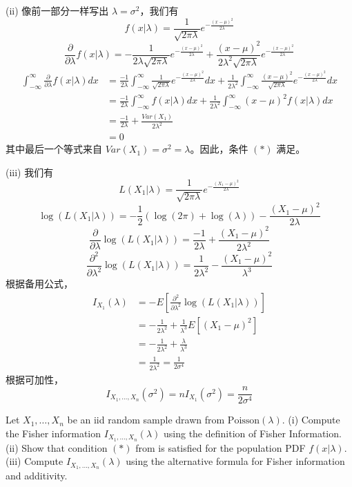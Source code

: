 \begin{questions}
\begin{solution}
(ii) 像前一部分一样写出 $\lambda = \sigma^2$，我们有
\[
f(x|\lambda) = \frac{1}{\sqrt{2\pi\lambda}} e^{-\frac{(x-\mu)^2}{2\lambda}}
\]
\[
\frac{\partial}{\partial \lambda} f(x|\lambda) = -\frac{1}{2\lambda\sqrt{2\pi\lambda}} e^{-\frac{(x-\mu)^2}{2\lambda}} + \frac{(x-\mu)^2}{2\lambda^2\sqrt{2\pi\lambda}} e^{-\frac{(x-\mu)^2}{2\lambda}}
\]
\begin{align*}
\int_{-\infty}^{\infty} \frac{\partial}{\partial \lambda} f(x|\lambda) dx &= \frac{-1}{2\lambda} \int_{-\infty}^{\infty} \frac{1}{\sqrt{2\pi\lambda}} e^{-\frac{(x-\mu)^2}{2\lambda}} dx + \frac{1}{2\lambda^2} \int_{-\infty}^{\infty} \frac{(x-\mu)^2}{\sqrt{2\pi\lambda}} e^{-\frac{(x-\mu)^2}{2\lambda}} dx \\
&= \frac{-1}{2\lambda} \int_{-\infty}^{\infty} f(x|\lambda) dx + \frac{1}{2\lambda^2} \int_{-\infty}^{\infty} (x-\mu)^2 f(x|\lambda) dx \\
&= \frac{-1}{2\lambda} + \frac{Var(X_1)}{2\lambda^2} \\
&= 0
\end{align*}
其中最后一个等式来自 $Var(X_1) = \sigma^2 = \lambda$。因此，条件 $(*)$ 满足。

(iii) 我们有
\[
L(X_1|\lambda) = \frac{1}{\sqrt{2\pi\lambda}} e^{-\frac{(X_1-\mu)^2}{2\lambda}}
\]
\[
\log(L(X_1|\lambda)) = -\frac{1}{2} (\log(2\pi) + \log(\lambda)) - \frac{(X_1-\mu)^2}{2\lambda}
\]
\[
\frac{\partial}{\partial \lambda} \log(L(X_1|\lambda)) = \frac{-1}{2\lambda} + \frac{(X_1-\mu)^2}{2\lambda^2}
\]
\[
\frac{\partial^2}{\partial \lambda^2} \log(L(X_1|\lambda)) = \frac{1}{2\lambda^2} - \frac{(X_1-\mu)^2}{\lambda^3}
\]
根据备用公式，
\begin{align*}
I_{X_1}(\lambda) &= -E\left[\frac{\partial^2}{\partial \lambda^2} \log(L(X_1|\lambda))\right] \\
&= -\frac{1}{2\lambda^2} + \frac{1}{\lambda^3} E[(X_1-\mu)^2] \\
&= -\frac{1}{2\lambda^2} + \frac{\lambda}{\lambda^3} \\
&= \frac{1}{2\lambda^2} = \frac{1}{2\sigma^4}
\end{align*}
根据可加性，
\[
I_{X_1, \dots, X_n}(\sigma^2) = n I_{X_1}(\sigma^2) = \frac{n}{2\sigma^4}
\]
\end{solution}

\question
Let $X_1, \dots, X_n$ be an iid random sample drawn from $\text{Poisson}(\lambda)$.
(i) Compute the Fisher information $I_{X_1, \dots, X_n}(\lambda)$ using the definition of Fisher Information.
(ii) Show that condition $(*)$ from is satisfied for the population PDF $f(x|\lambda)$.
(iii) Compute $I_{X_1, \dots, X_n}(\lambda)$ using the alternative formula for Fisher information and additivity.


\end{questions}
